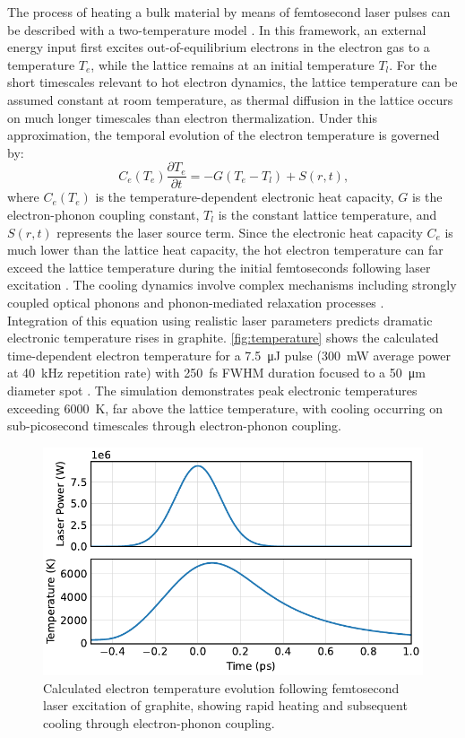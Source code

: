 \documentclass[
	parskip=half,
	a4paper,
]{scrarticle}
\begin{document}
The process of heating a bulk material by means of femtosecond laser pulses can be described with a two-temperature model \cite{roob_thermal_2025}. In this framework, an external energy input first excites out-of-equilibrium electrons in the electron gas to a temperature $T_e$, while the lattice remains at an initial temperature $T_l$. For the short timescales relevant to hot electron dynamics, the lattice temperature can be assumed constant at room temperature, as thermal diffusion in the lattice occurs on much longer timescales than electron thermalization. Under this approximation, the temporal evolution of the electron temperature is governed by:
\begin{equation}
C_e(T_e) \frac{\partial T_e}{\partial t} = -G(T_e - T_l) + S(r,t)\text{,}
\end{equation}
where $C_e(T_e)$ is the temperature-dependent electronic heat capacity, $G$ is the electron-phonon coupling constant, $T_l$ is the constant lattice temperature, and $S(r,t)$ represents the laser source term. Since the electronic heat capacity $C_e$ is much lower than the lattice heat capacity, the hot electron temperature can far exceed the lattice temperature during the initial femtoseconds following laser excitation \cite{nihira_temperature_2003}. The cooling dynamics involve complex mechanisms including strongly coupled optical phonons \cite{kampfrath_strongly_2005} and phonon-mediated relaxation processes \cite{stange_hot_2015}.\\
Integration of this equation using realistic laser parameters predicts dramatic electronic temperature rises in graphite. \autoref{fig:temperature} shows the calculated time-dependent electron temperature for a \SI{7.5}{\micro J} pulse (\SI{300}{mW} average power at \SI{40}{kHz} repetition rate) with \SI{250}{fs} FWHM duration focused to a \SI{50}{\micro m} diameter spot \cite{roob_thermal_2025}. The simulation demonstrates peak electronic temperatures exceeding \SI{6000}{K}, far above the lattice temperature, with cooling occurring on sub-picosecond timescales through electron-phonon coupling.
\begin{figure}[hb]
    \centering
    \includegraphics{../analysis/figures/model te.pdf}
    \caption{Calculated electron temperature evolution following femtosecond laser excitation of graphite, showing rapid heating and subsequent cooling through electron-phonon coupling.}
    \label{fig:temperature}
\end{figure}
\end{document}

